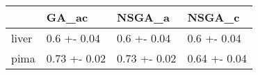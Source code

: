 \begin{tabular}{llll}
\toprule
{} &         GA\_ac &        NSGA\_a &        NSGA\_c \\
\midrule
liver &   0.6 +- 0.04 &   0.6 +- 0.04 &   0.6 +- 0.04 \\
pima  &  0.73 +- 0.02 &  0.73 +- 0.02 &  0.64 +- 0.04 \\
\bottomrule
\end{tabular}

